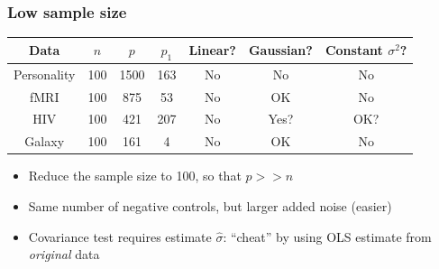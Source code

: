 \documentclass{beamer}
\begin{document}
\begin{frame}
\frametitle{Low sample size}
\begin{center}
\begin{tabular}{|c|c|c|c|c|c|c|}
\hline
Data & $n$ & $p$ & $p_1$ & Linear? & Gaussian? & Constant $\sigma^2$?\\ \hline
Personality & 100 & 1500 & 163 & No & No & No\\ \hline
fMRI & 100 & 875 & 53 & No & OK & No \\ \hline
HIV & 100 & 421 & 207 & No & Yes? & OK? \\ \hline
Galaxy & 100 & 161 & 4 & No & OK & No \\ \hline
\end{tabular}
\end{center}
\begin{itemize}
\item Reduce the sample size to 100, so that $p >> n$
\item Same number of negative controls, but larger added noise (easier)
\item Covariance test requires estimate $\hat{\sigma}$: ``cheat'' by using OLS estimate from \emph{original} data
\end{itemize}
\end{frame}
\end{document}

